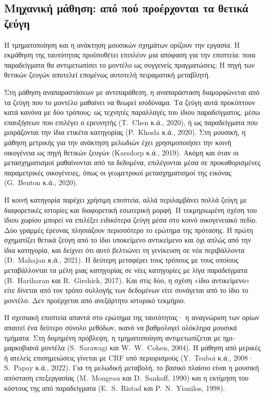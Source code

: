 \documentclass[11pt,a4paper]{article}
\begin{document}
\subsection{Μηχανική μάθηση: από πού προέρχονται τα θετικά ζεύγη}
Η τμηματοποίηση και η ανάκτηση μουσικών σχημάτων ορίζουν την εργασία. Η εκμάθηση της ταυτότητας προϋποθέτει επιπλέον μια απόφαση για την εποπτεία: ποια παραδείγματα θα αντιμετωπίσει το μοντέλο ως συγγενείς πραγματώσεις; Η πηγή των θετικών ζευγών αποτελεί επομένως αυτοτελή πειραματική μεταβλητή.

Στη μάθηση αναπαραστάσεων με αντιπαράθεση, η αναπαράσταση διαμορφώνεται από τα ζεύγη που το μοντέλο μαθαίνει να θεωρεί ισοδύναμα. Τα ζεύγη αυτά προκύπτουν κατά κανόνα με δύο τρόπους: ως τεχνητές παραλλαγές του ίδιου παραδείγματος, μέσω επαυξήσεων που επιλέγει ο ερευνητής (T.~Chen κ.ά., 2020), ή ως παραδείγματα που μοιράζονται την ίδια ετικέτα κατηγορίας (P.~Khosla κ.ά., 2020). Στη μουσική, η μάθηση μετρικής για την ανάκτηση μελωδιών έχει χρησιμοποιήσει την κοινή οικογένεια ως πηγή θετικών ζευγών (Karsdorp κ.ά., 2019). Ακόμη και όταν οι μετασχηματισμοί μαθαίνονται από τα δεδομένα, επιλέγονται μέσα σε προκαθορισμένες παραμετρικές οικογένειες, όπως οι γεωμετρικοί μετασχηματισμοί της εικόνας (G.~Benton κ.ά., 2020).

Η κοινή κατηγορία παρέχει χρήσιμη εποπτεία, αλλά περιλαμβάνει πολλά ζεύγη με διαφορετικές ιστορίες και διαφορετική εσωτερική μορφή. Η τεκμηριωμένη σχέση του ίδιου χωρίου μπορεί να επιλέξει ειδικότερα ζεύγη μέσα στο κοινό οικογενειακό πεδίο. Δύο γραμμές έρευνας πλησιάζουν περισσότερο το ερώτημα της πρότασης. Η πρώτη σχηματίζει θετικά ζεύγη από το ίδιο υποκείμενο αντικείμενο και όχι απλώς από την ίδια κατηγορία, και δείχνει ότι αυτό βελτιώνει τη γενίκευση σε νέα περιβάλλοντα (D.~Mahajan κ.ά., 2021). Η δεύτερη μεταφέρει τους τρόπους με τους οποίους μεταβάλλονται τα μέλη μιας κατηγορίας σε νέες κατηγορίες με λίγα παραδείγματα (B.~Hariharan και R.~Girshick, 2017). Και στις δύο, η σχέση «ίδιο αντικείμενο» είτε δίνεται από τον τρόπο συλλογής των δεδομένων είτε συνάγεται από το ίδιο το μοντέλο. Δεν προέρχεται από ανεξάρτητο ιστορικό τεκμήριο.

Η σχεσιακή εποπτεία απαντά στο ερώτημα της ταυτότητας· η αναγνώριση των ορίων απαιτεί ένα δεύτερο σύνολο μεθόδων, ικανό να βαθμολογεί ολόκληρα μουσικά τμήματα. Στη δομημένη πρόβλεψη, η τμηματοποίηση αντιμετωπίζεται με ημι-μαρκοβιανά μοντέλα (S.~Sarawagi και W.~W.~Cohen, 2004). Η μάθηση από μερικές ή ατελείς επισημειώσεις γίνεται με CRF υπό περιορισμούς (Y.~Tsuboi κ.ά., 2008· S.~Papay κ.ά., 2022). Για τη μελωδική μεταβολή, το βασικό πλαίσιο είναι η μουσική απόσταση επεξεργασίας (M.~Mongeau και D.~Sankoff, 1990) και η εκτίμηση του κόστους της από παραδείγματα (E.~S.~Ristad και P.~N.~Yianilos, 1998).
\end{document}
